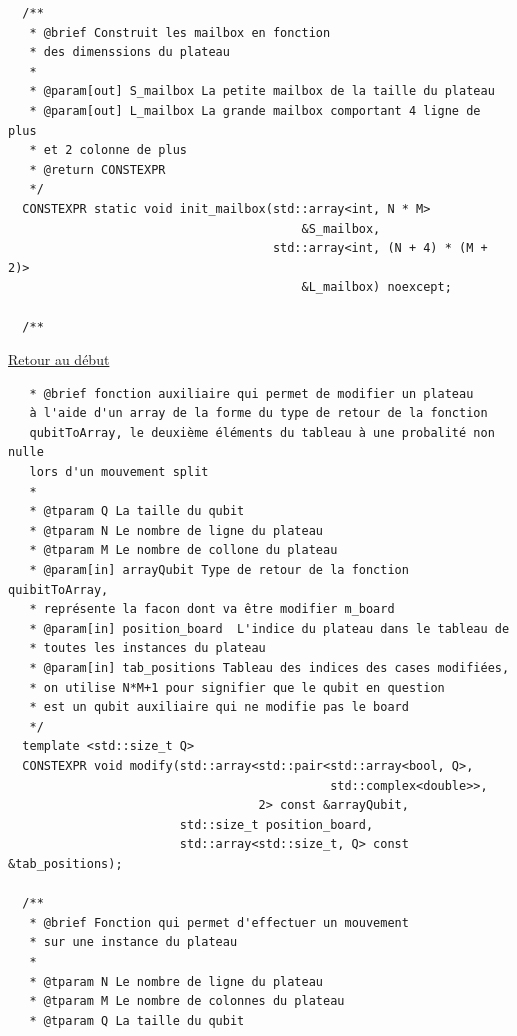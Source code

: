 {\begin{frame}[fragile]
\begin{verbatim}
  /**
   * @brief Construit les mailbox en fonction
   * des dimenssions du plateau
   *
   * @param[out] S_mailbox La petite mailbox de la taille du plateau
   * @param[out] L_mailbox La grande mailbox comportant 4 ligne de plus
   * et 2 colonne de plus
   * @return CONSTEXPR
   */
  CONSTEXPR static void init_mailbox(std::array<int, N * M>
                                         &S_mailbox,
                                     std::array<int, (N + 4) * (M + 2)>
                                         &L_mailbox) noexcept;

  /**
\end{verbatim}
\end{frame}

\begin{frame}[fragile]
\hyperlink{conclusion}{Retour au début}\newline
\begin{verbatim}
   * @brief fonction auxiliaire qui permet de modifier un plateau
   à l'aide d'un array de la forme du type de retour de la fonction
   qubitToArray, le deuxième éléments du tableau à une probalité non nulle
   lors d'un mouvement split
   *
   * @tparam Q La taille du qubit
   * @tparam N Le nombre de ligne du plateau
   * @tparam M Le nombre de collone du plateau
   * @param[in] arrayQubit Type de retour de la fonction quibitToArray,
   * représente la facon dont va être modifier m_board
   * @param[in] position_board  L'indice du plateau dans le tableau de
   * toutes les instances du plateau
   * @param[in] tab_positions Tableau des indices des cases modifiées,
   * on utilise N*M+1 pour signifier que le qubit en question
   * est un qubit auxiliaire qui ne modifie pas le board
   */
  template <std::size_t Q>
  CONSTEXPR void modify(std::array<std::pair<std::array<bool, Q>,
                                             std::complex<double>>,
                                   2> const &arrayQubit,
                        std::size_t position_board,
                        std::array<std::size_t, Q> const &tab_positions);

  /**
   * @brief Fonction qui permet d'effectuer un mouvement
   * sur une instance du plateau
   *
   * @tparam N Le nombre de ligne du plateau
   * @tparam M Le nombre de colonnes du plateau
   * @tparam Q La taille du qubit
\end{verbatim}
\end{frame}

}
